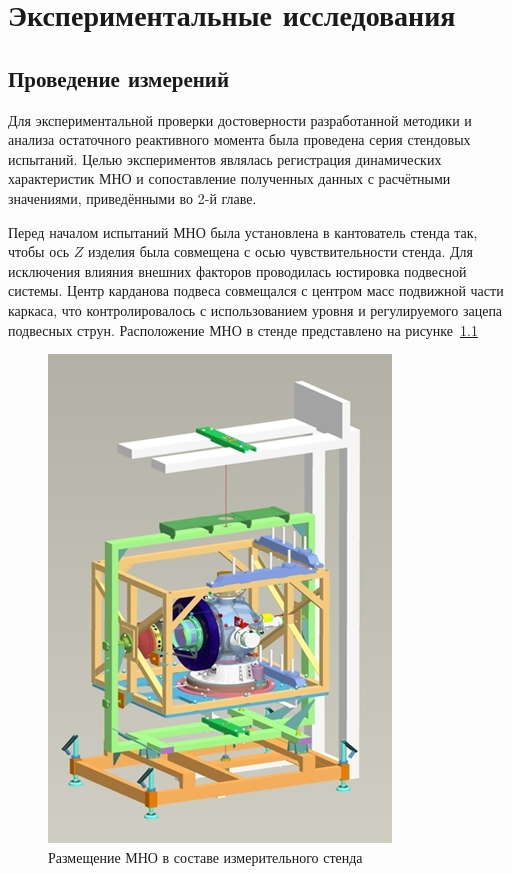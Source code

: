 \chapter{Экспериментальные исследования}\label{ch:ch4}

\section{Проведение измерений}

Для экспериментальной проверки достоверности разработанной методики и анализа остаточного реактивного момента была проведена серия стендовых испытаний. Целью экспериментов являлась регистрация динамических характеристик МНО и сопоставление полученных данных с расчётными значениями, приведёнными во 2-й главе.

Перед началом испытаний МНО была установлена в кантователь стенда так, чтобы ось $Z$ изделия была совмещена с осью чувствительности стенда. Для исключения влияния внешних факторов проводилась юстировка подвесной системы. Центр карданова подвеса совмещался с центром масс подвижной части каркаса, что контролировалось с использованием уровня и регулируемого зацепа подвесных струн. Расположение МНО в стенде представлено на рисунке~\cref{fig:yoim-omn}

\begin{figure}[h!]
	\centering
	\includegraphics[scale=0.8]{images/yoim-omn}
	\caption{Размещение МНО в составе измерительного стенда}
	\label{fig:yoim-omn}
\end{figure}

